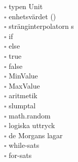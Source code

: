 \begin{multicols}{3}
$\square$ typen Unit \\
$\square$ enhetsvärdet () \\
$\square$ stränginterpolatorn s \\
$\square$ if \\
$\square$ else \\
$\square$ true \\
$\square$ false \\
$\square$ MinValue \\
$\square$ MaxValue \\
$\square$ aritmetik \\
$\square$ slumptal \\
$\square$ math.random \\
$\square$ logiska uttryck \\
$\square$ de Morgans lagar \\
$\square$ while-sats \\
$\square$ for-sats \\
    \end{multicols}
    